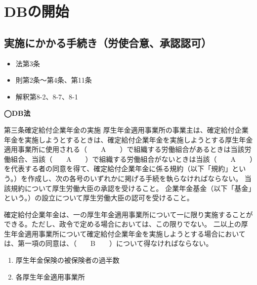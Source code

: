 \section{DBの開始}

\subsection{実施にかかる手続き（労使合意、承認認可）}


\begin{InyouJobunbox}
  \begin{itemize}
    \item 法第3条
    \item 則第2条〜第4条、第11条
    \item 解釈第8-2、8-7、8-1
  \end{itemize}
\end{InyouJobunbox}


\begin{fillblank}[自作 2026/10/4]

  \noindent \textbf{◯DB法}
  \begin{lawstructure}
    \begin{lawarticle}{第三条}{確定給付企業年金の実施}
      厚生年金適用事業所の事業主は、確定給付企業年金を実施しようとするときは、確定給付企業年金を実施しようとする厚生年金適用事業所に使用される（　　A　　）で組織する労働組合があるときは当該労働組合、当該（　　A　　）で組織する労働組合がないときは当該（　　A　　）を代表する者の同意を得て、確定給付企業年金に係る規約（以下「規約」という。）を作成し、次の各号のいずれかに掲げる手続を執らなければならない。
      当該規約について厚生労働大臣の承認を受けること。
      企業年金基金（以下「基金」という。）の設立について厚生労働大臣の認可を受けること。

      確定給付企業年金は、一の厚生年金適用事業所について一に限り実施することができる。ただし、政令で定める場合においては、この限りでない。
      二以上の厚生年金適用事業所について確定給付企業年金を実施しようとする場合においては、第一項の同意は、（　　B　　）について得なければならない。
    \end{lawarticle}
  \end{lawstructure}

\end{fillblank}

\begin{answerbox}
 \begin{enumerate}[A:]
    \item 厚生年金保険の被保険者の過半数
    \item 各厚生年金適用事業所
  \end{enumerate}
\end{answerbox}


